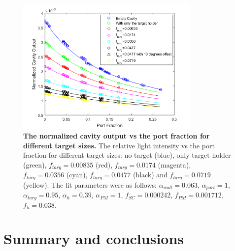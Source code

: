 \documentclass[a4paper]{article}
\begin{document}
\begin{figure}
\centering
\includegraphics[width=0.8\textwidth]{figures/target.png}
\caption{\textbf{The normalized cavity output vs the port fraction for different target sizes.} The relative light intensity vs the port fraction for different target sizes: no target (blue), only target holder (green), $f_{targ}=0.00835$ (red), $f_{targ}=0.0174$ (magenta), $f_{targ}=0.0356$ (cyan), $f_{targ}=0.0477$ (black) and $f_{targ}=0.0719$ (yellow). The fit parameters were as follows: $\alpha_{wall}=0.063$, $\alpha_{port}=1$, $\alpha_{targ}=0.95$, $\alpha_{h}=0.39$, $\alpha_{PM}=1$, $f_{SC}=0.000242$,  $f_{PM}=0.001712$, $f_{h}=0.038$.}
\label{fig:target_size}
\end{figure}

\section{Summary and conclusions}
\end{document}
